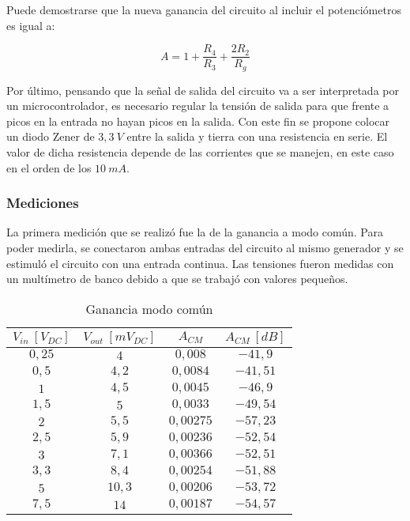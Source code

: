 Puede demostrarse que la nueva ganancia del circuito al incluir el potenciómetros es igual a:

\begin{equation}
\boxed{A = 1 + \frac{R_4}{R_3} + \frac{2R_2}{R_g}}
\end{equation}

Por \'ultimo, pensando que la señal de salida del circuito va a ser interpretada por un microcontrolador, es necesario regular la tensi\'on de salida para que frente a picos en la entrada no hayan picos en la salida. Con este fin se propone colocar un diodo Zener de $3,3 \ V$ entre la salida y tierra con una resistencia en serie. El valor de dicha resistencia depende de las corrientes que se manejen, en este caso en el orden de los $10 \ mA$.

\subsubsection{Mediciones}

La primera medici\'on que se realiz\'o fue la de la ganancia a modo com\'un. Para poder medirla, se conectaron ambas entradas del circuito al mismo generador y se estimul\'o el circuito con una entrada continua. Las tensiones fueron medidas con un mult\'imetro de banco debido a que se trabaj\'o con valores pequeños.


\begin{table}[H]
\centering
\begin{tabular}{cccc}\hline
$V_{in} \ [V_{DC}]$ & $V_{out} \ [mV_{DC}]$ & $A_{CM}$ & $A_{CM} \ [dB]$ \\
\hline
$0,25$ & $4$ & $0,008$ & $-41,9$ \\
$0,5$   & $4,2$  & $0,0084$ & $-41,51$ \\
$1$  & $4,5$ & $0,0045$ & $-46,9$\\
$1,5$  & $5$ & $0,0033$ & $-49,54$\\
$2$  & $5,5$ & $0,00275$ & $-57,23$\\
$2,5$  & $5,9$ & $0,00236$ & $-52,54$\\
$3$  & $7,1$ & $0,00366$ & $-52,51$\\
$3,3$  & $8,4$ & $0,00254$ & $-51,88$\\
$5$  & $10,3$ & $0,00206$ & $-53,72$\\
$7,5$  & $14$ & $0,00187$ & $-54,57$\\ \hline
\end{tabular}
\caption{Ganancia modo com\'un}
\label{table:ganancia_comun}
\end{table}


